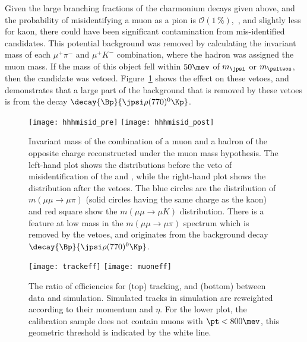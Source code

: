 Given the large branching fractions of the charmonium decays given above, and the probability of
misidentifying a muon as a pion is $\mathcal{O}(1\,\%)$,~\cite{LHCb-DP-2013-001}, and slightly less
for kaon, there could have been significant contamination from mis-identified candidates.
This potential background was removed by calculating the invariant mass of each $\mu^+\pi^-$ and
$\mu^+K^-$ combination, where the hadron was assigned the muon mass.
If the mass of this object fell within $50\mev$ of $m_\jpsi$ or $m_\psitwos$, then the candidate
was vetoed.
Figure~\ref{fig:hhh:misid} shows the effect on these vetoes, and demonstrates that a large part
of the background that is removed by these vetoes is from the decay
$\decay{\Bp}{\jpsi\rho(770)^0\Kp}$.


\begin{figure}
  \begin{center}
    \texttt{[image: hhhmisid\_pre]}
    \texttt{[image: hhhmisid\_post]}
    \caption[Backgrounds from misidentified charmonia]
    {\small
      Invariant mass of the combination of a muon and a hadron of the opposite charge
      reconstructed under the muon mass hypothesis.
      The left-hand plot shows the distributions before the veto of misidentification of the \jpsi
      and \psitwos, while the right-hand plot shows the distribution after the vetoes.
      The blue circles are the distribution of $m(\mu\mu\to\mu\pi)$ (solid circles having the same
      charge as the kaon) and red square show the $m(\mu\mu\to\mu K)$ distribution.
      There is a feature at low mass in the $m(\mu\mu\to\mu\pi)$ spectrum which is removed by the
      vetoes, and originates from the background decay $\decay{\Bp}{\jpsi\rho(770)^0\Kp}$.
    }
    \label{fig:hhh:misid}
  \end{center}
\end{figure}

\begin{figure}[h]
  \begin{center}
    \texttt{[image: trackeff]}
    \texttt{[image: muoneff]}
  \end{center}
  \caption{
    The ratio of efficiencies for (top) tracking, and (bottom) \ismuon between data and simulation.
    Simulated tracks in simulation are reweighted according to their momentum and $\eta$.
    For the lower plot, the calibration sample does not contain muons with $\pt<800\mev$, this
    geometric threshold is indicated by the white line.
  }
  \label{fig:hhh:trackeff}
\end{figure}

